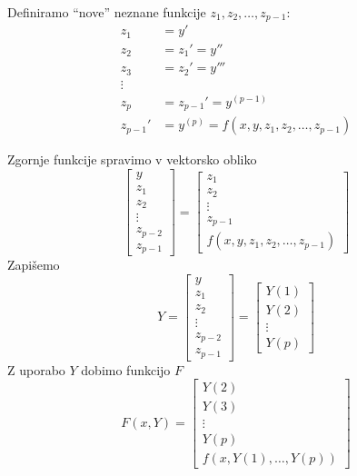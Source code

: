 \documentclass[a4paper,12pt]{article}
\theoremstyle{definition}
\theoremstyle{remark}
\begin{document}
Definiramo ``nove'' neznane funkcije $z_1, z_2, \dots, z_{p-1}$:
\begin{align*}
    z_1 &= y'\\
    z_2 &= z_1' = y'' \\
    z_3 &= z_2' = y''' \\
    \vdots \\
    z_{p} &= z_{p-1}' = y^{(p-1)} \\
    z_{p-1}' &= y^{(p)} = f(x, y, z_1, z_2, \dots, z_{p-1})
\end{align*}

Zgornje funkcije spravimo v vektorsko obliko
\begin{equation*}
    \begin{bmatrix}
        y \\
        z_1 \\
        z_2 \\
        \vdots \\
        z_{p-2} \\
        z_{p-1}
    \end{bmatrix}
    =
    \begin{bmatrix}
        z_1 \\
        z_2 \\
        \vdots \\
        z_{p-1} \\
        f(x, y, z_1, z_2, \dots, z_{p-1})
    \end{bmatrix}
\end{equation*}
Zapišemo
\begin{equation*}
    Y = \begin{bmatrix}
        y \\
        z_1 \\
        z_2 \\
        \vdots \\
        z_{p-2} \\
        z_{p-1}
    \end{bmatrix}
    =
    \begin{bmatrix}
        Y(1) \\
        Y(2) \\
        \vdots \\
        Y(p)
    \end{bmatrix}
\end{equation*}
Z uporabo $Y$ dobimo funkcijo $F$
\begin{equation*}
    F(x, Y) = \begin{bmatrix}
        Y(2) \\
        Y(3) \\
        \vdots \\
        Y(p) \\
        f(x, Y(1), \dots, Y(p))
    \end{bmatrix}
\end{equation*}
\end{document}
